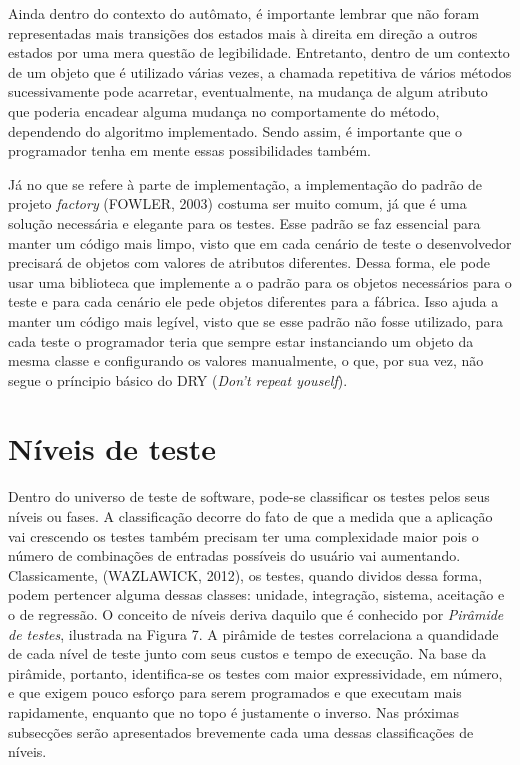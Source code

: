 \documentclass[
    12pt,       %
    openright,      %
    twoside,      %
    a4paper,      %
    english,      %
    french,       %
    spanish,      %
    brazil,       %
    ]{abntex2}
\begin{document}
          Ainda dentro do contexto do autômato, é importante lembrar que não foram representadas
          mais transições dos estados mais à direita em direção a outros estados por uma mera
          questão de legibilidade. Entretanto, dentro de um contexto de um objeto que é utilizado
          várias vezes, a chamada repetitiva de vários métodos sucessivamente pode acarretar,
          eventualmente, na mudança de algum atributo que poderia encadear alguma mudança no
          comportamente do método, dependendo do algoritmo implementado. Sendo assim, é importante
          que o programador tenha em mente essas possibilidades também.

          Já no que se refere à parte de implementação, a implementação do padrão de projeto
          \textit{factory} (FOWLER, 2003) costuma ser muito comum, já que é uma solução necessária e
          elegante para os testes. Esse padrão se faz essencial para manter um código mais limpo,
          visto que em cada cenário de teste o desenvolvedor precisará de objetos com valores de
          atributos diferentes. Dessa forma, ele pode usar uma biblioteca que implemente a
          o padrão para os objetos necessários para o teste e para cada cenário ele pede
          objetos diferentes para a fábrica. Isso ajuda a manter um código mais legível, visto
          que se esse padrão não fosse utilizado, para cada teste o programador teria que sempre
          estar instanciando um objeto da mesma classe e configurando os valores manualmente,
          o que, por sua vez, não segue o príncipio básico do DRY (\textit{Don't repeat youself}).

      \section{Níveis de teste}
          Dentro do universo de teste de software, pode-se classificar os testes pelos seus
          níveis ou fases. A classificação decorre do fato de que a medida que a aplicação
          vai crescendo os testes também precisam ter uma complexidade maior pois o número
          de combinações de entradas possíveis do usuário vai aumentando. Classicamente,
          (WAZLAWICK, 2012), os testes, quando dividos dessa forma, podem pertencer alguma
          dessas classes: unidade, integração, sistema, aceitação e o de regressão. O
          conceito de níveis deriva daquilo que é conhecido por \textit{Pirâmide de testes},
          ilustrada na Figura 7. A pirâmide de testes correlaciona a quandidade de cada nível
          de teste junto com seus custos e tempo de execução. Na base da pirâmide, portanto,
          identifica-se os testes com maior expressividade, em número, e que exigem pouco
          esforço para serem programados e que executam mais rapidamente, enquanto que no topo
          é justamente o inverso. Nas próximas subsecções serão apresentados brevemente cada
          uma dessas classificações de níveis.
\end{document}
